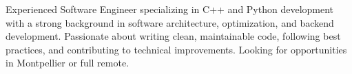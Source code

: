 

\begin{cvparagraph}

Experienced Software Engineer specializing in C++ and Python development with a strong background in software architecture, optimization, and backend development. Passionate about writing clean, maintainable code, following best practices, and contributing to technical improvements. Looking for opportunities in Montpellier or full remote.
\end{cvparagraph}
